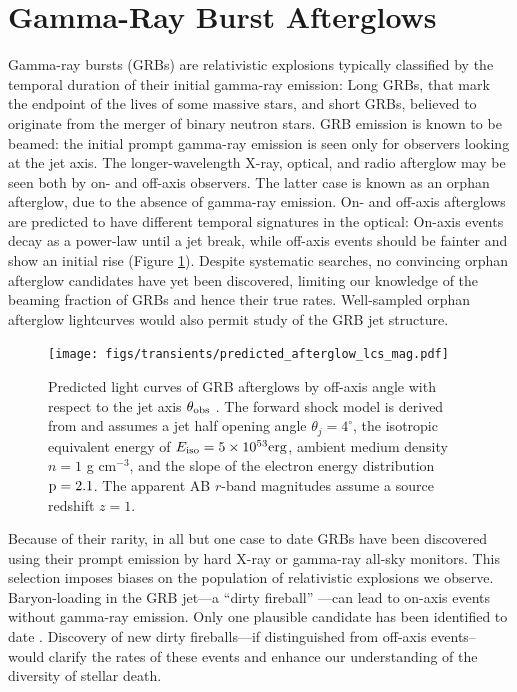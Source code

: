 %
%

\section{Gamma-Ray Burst Afterglows}
\def\secname{\chpname:grbs}\label{sec:\secname}


Gamma-ray bursts (GRBs) are relativistic explosions typically classified
by the temporal duration of their initial gamma-ray emission: Long GRBs,
that mark the endpoint of the lives of some massive stars, and short
GRBs, believed to originate from the merger of binary neutron stars. GRB
emission is known to be beamed: the initial prompt gamma-ray emission is
seen only for observers looking at the jet axis. The longer-wavelength
X-ray, optical, and radio afterglow may be seen both by on- and off-axis
observers.  The latter case is known as an orphan afterglow, due to the
absence of gamma-ray emission. On- and off-axis afterglows are predicted
to have different temporal signatures in the optical: On-axis events
decay as a power-law until a jet break, while off-axis events should be
fainter and show an initial rise (Figure \ref{fig:afterglow_lcs}).
Despite systematic searches, no convincing orphan afterglow candidates
have yet been discovered, limiting our knowledge of the beaming fraction
of GRBs and hence their true rates. Well-sampled orphan afterglow
lightcurves would also permit study of the GRB jet structure.

\begin{figure}[hbt]
\centerline{
\texttt{[image: figs/transients/predicted\_afterglow\_lcs\_mag.pdf]}
}
\caption{ Predicted light curves of GRB afterglows by off-axis angle
with respect to the jet axis $\theta_{\rm obs}$ \citep[Figure
8.8,][]{2009arXiv0912.0201L}. The forward shock model is derived from
\citet{2002ApJ...576..120T} and assumes a jet half opening angle
$\theta_j = 4^\circ$, the isotropic equivalent energy of $E_{\rm iso} =
5\times10^{53} \rm erg$, ambient medium density $n = 1$ g cm$^{-3}$, and
the slope of the electron energy distribution $\rm p = 2.1$. The
apparent AB $r$-band magnitudes assume a source redshift $z = 1$. }
\label{fig:afterglow_lcs}
\end{figure}

Because of their rarity, in all but one case \citep{2015ApJ...803L..24C}
to date GRBs have been discovered using their prompt emission by hard
X-ray or gamma-ray all-sky monitors. This selection imposes biases on
the population of relativistic explosions we observe. Baryon-loading in
the GRB jet---a ``dirty fireball'' \citep{2003ApJ...591.1097R}---can
lead to on-axis events without gamma-ray emission.  Only one plausible
candidate has been identified to date \citep{2013ApJ...769..130C}.
Discovery of new dirty fireballs---if distinguished from off-axis
events--would clarify the rates of these events and enhance our
understanding of the diversity of stellar death.

